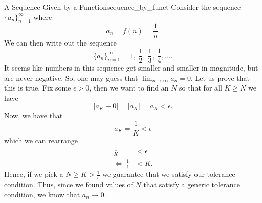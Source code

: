 \begin{ex}{A Sequence Given by a Function}{sequence_by_funct}
Consider the sequence $\{a_n\}_{n=1}^\infty$ where 
\[
a_n = f(n) = \frac{1}{n}.
\]
We can then write out the sequence
\[
\{a_n\}_{n=1}^\infty = 1, ~\frac{1}{2}, ~\frac{1}{3}, ~ \frac{1}{4}, \dots.
\]
It seems like numbers in this sequence get smaller and smaller in magnitude, but are never negative.  So, one may guess that $\lim_{n\to \infty} a_n = 0$.  Let us prove that this is true.  Fix some $\epsilon >0$, then we want to find an $N$ so that for all $K\geq N$ we have
\[
|a_K - 0| = |a_K|=a_K<\epsilon.
\]
Now, we have that
\[
a_K=\frac{1}{K} < \epsilon
\]
which we can rearrange 
\begin{align*}
    \frac{1}{K} & < \epsilon \\
    \iff~ \frac{1}{\epsilon} & < K.
\end{align*}
Hence, if we pick a $N\geq K>\frac{1}{\epsilon}$ we guarantee that we satisfy our tolerance condition. Thus, since we found values of $N$ that satisfy a generic tolerance condition, we know that $a_n \to 0$.


\end{ex}
